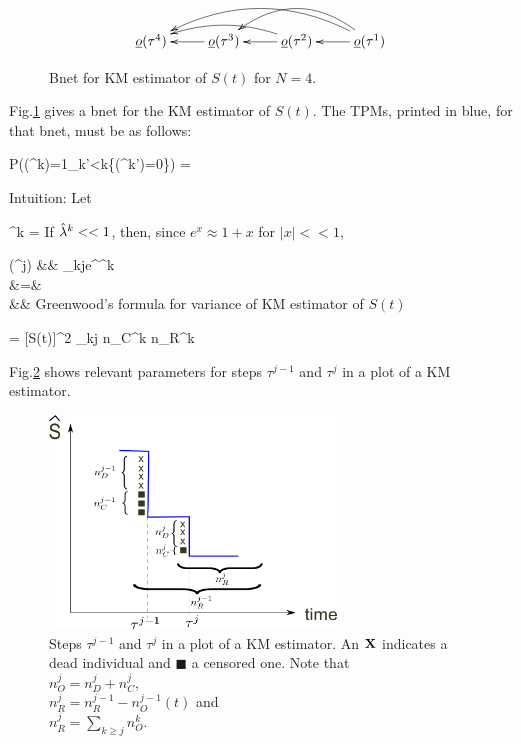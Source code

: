 \begin{figure}[h!]
$$
\xymatrix{
\rvo(\tau^4)
&\rvo(\tau^3)\ar[l]
&\rvo(\tau^2)\ar[l]\ar@/_1pc/[ll]
&\rvo(\tau^1)\ar[l]\ar@/_2pc/[ll]\ar@/_2pc/[lll]
}
$$
\caption{Bnet for KM estimator of $S(t)$
for $N=4$.}
\label{fig-censorless-est}
\end{figure}

Fig.\ref{fig-censorless-est}
gives a bnet for the KM estimator of $S(t)$.
The TPMs, printed in blue, for that bnet,
must be as follows:

\beq \color{blue}
P(\rvo(\tau^k)=1\cond \bigA_{k'<k}\{\rvo(\tau^{k'})=0\})
= 
\eeq

Intuition:
Let

\beq
\hat{\lam}^k = 
\eeq
If $\hat{\lambda}^k<<1$, then, since
$e^x \approx 1+x $ for $|x|<<1$,

\beqa
{}(\tau^j) &\approx&
\prod_{k\leq j}e^{\hat{\lam}^k}
\\
&=&
\\
&\approx&
\eeqa
Greenwood's formula
for variance of KM estimator of $S(t)$

\beq
{}=
[S(t)]^2
\sum_{k\leq j}
{ n_C^k n_R^k}
\eeq

Fig.\ref{fig-km-step}
shows relevant parameters
for steps $\tau^{j-1}$ and $\tau^j$
in a plot of a KM estimator.

\begin{figure}[h!]
\centering
\includegraphics[width=3in]
{survival/km-step.png}
\caption{Steps $\tau^{j-1}$ and $\tau^j$
in a plot of a KM estimator. An ${\bf X}$ indicates a dead individual
and $\blacksquare$ a censored one.
Note that\\
$n_O^j= n_D^j+n_C^j$, \\
$n_R^j = n_R^{j-1} - n_O^{j-1}(t)$
and\\
$n_R^j = \sum_{k\geq j} n_O^k$.}
\label{fig-km-step}
\end{figure}

